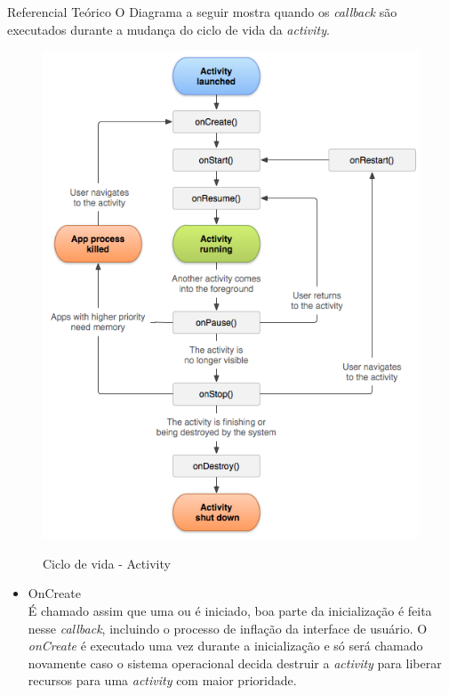 \documentclass[
	12pt,				%
	openright,			%
	twoside,			%
	a4paper,			%
	english,			%
	french,				%
	spanish,			%
	brazil				%
	]{abntex2}
\begin{document}
\begin{chapter}{Referencial Teórico}
O Diagrama a seguir mostra quando os \textit{callback} são executados durante a mudança do ciclo de vida da \textit{activity}.
\begin{figure}[h]
\centering
   \caption{Ciclo de vida - Activity}
   \includegraphics[scale=0.70]{media/activity_lifecycle.png}
     \label{fig:lifecycle}
\end{figure}

\newpage
\begin{itemize}
\item{OnCreate} \\
     É chamado assim que uma  ou  é iniciado, boa parte da inicialização é feita nesse \textit{callback}, incluindo o processo de inflação da interface de usuário. O \textit{onCreate} é executado uma vez durante a inicialização e só será chamado novamente caso o sistema operacional decida destruir a \textit{activity} para liberar recursos para uma \textit{activity} com maior prioridade.
     

\end{itemize}
\end{chapter}
\end{document}
